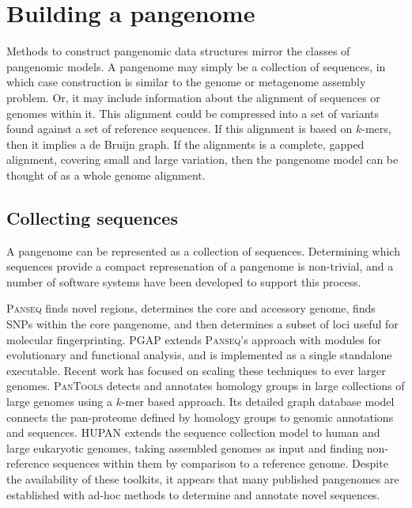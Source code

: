 \section{Building a pangenome}

Methods to construct pangenomic data structures mirror the classes of pangenomic models.
A pangenome may simply be a collection of sequences, in which case construction is similar to the genome or metagenome assembly problem.
Or, it may include information about the alignment of sequences or genomes within it.
This alignment could be compressed into a set of variants found against a set of reference sequences.
If this alignment is based on $k$-mers, then it implies a de Bruijn graph.
If the alignments is a complete, gapped alignment, covering small and large variation, then the pangenome model can be thought of as a whole genome alignment.

\subsection{Collecting sequences}

A pangenome can be represented as a collection of sequences.
Determining which sequences provide a compact represenation of a pangenome is non-trivial, and a number of software systems have been developed to support this process.

\textsc{Panseq} \cite{Laing_2010} finds novel regions, determines the core and accessory genome, finds SNPs within the core pangenome, and then determines a subset of loci useful for molecular fingerprinting.
\textsc{PGAP} \cite{Zhao_2011} extends \textsc{Panseq}'s approach with modules for evolutionary and functional analysis, and is implemented as a single standalone executable.
Recent work has focused on scaling these techniques to ever larger genomes.
\textsc{PanTools} \cite{Sheikhizadeh_Anari_2018} detects and annotates homology groups in large collections of large genomes using a $k$-mer based approach.
Its detailed graph database model connects the pan-proteome defined by homology groups to genomic annotations and sequences.
\textsc{HUPAN} \citep{Duan_2019} extends the sequence collection model to human and large eukaryotic genomes, taking assembled genomes as input and finding non-reference sequences within them by comparison to a reference genome.
Despite the availability of these toolkits, it appears that many published pangenomes are established with ad-hoc methods to determine and annotate novel sequences.

